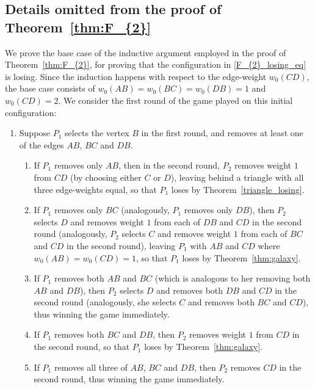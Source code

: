 \documentclass[11pt,reqno]{amsart}
\theoremstyle{definition}
\theoremstyle{definition}
\begin{document}
\subsection{Details omitted from the proof of Theorem~\ref{thm:F_{2}}}\label{subsec:appendix_4_vertices}
We prove the base case of the inductive argument employed in the proof of Theorem~\ref{thm:F_{2}}, for proving that the configuration in \eqref{F_{2}_losing_eq} is losing. Since the induction happens with respect to the edge-weight $w_{0}(CD)$, the base case consists of $w_{0}(AB)=w_{0}(BC)=w_{0}(DB)=1$ and $w_{0}(CD)=2$. We consider the first round of the game played on this initial configuration:
\begin{enumerate}
\item Suppose $P_{1}$ selects the vertex $B$ in the first round, and removes at least one of the edges $AB$, $BC$ and $DB$. 
\begin{enumerate}
\item  If $P_{1}$ removes only $AB$, then in the second round, $P_{2}$ removes weight $1$ from $CD$ (by choosing either $C$ or $D$), leaving behind a triangle with all three edge-weights equal, so that $P_{1}$ loses by Theorem~\ref{triangle_losing}.
\item If $P_{1}$ removes only $BC$ (analogously, $P_{1}$ removes only $DB$), then $P_{2}$ selects $D$ and removes weight $1$ from each of $DB$ and $CD$ in the second round (analogously, $P_{2}$ selects $C$ and removes weight $1$ from each of $BC$ and $CD$ in the second round), leaving $P_{1}$ with $AB$ and $CD$ where $w_{0}(AB)=w_{0}(CD)=1$, so that $P_{1}$ loses by Theorem~\ref{thm:galaxy}.
\item If $P_{1}$ removes both $AB$ and $BC$ (which is analogous to her removing both $AB$ and $DB$), then $P_{2}$ selects $D$ and removes both $DB$ and $CD$ in the second round (analogously, she selects $C$ and removes both $BC$ and $CD$), thus winning the game immediately.
\item If $P_{1}$ removes both $BC$ and $DB$, then $P_{2}$ removes weight $1$ from $CD$ in the second round, so that $P_{1}$ loses by Theorem~\ref{thm:galaxy}.
\item If $P_{1}$ removes all three of $AB$, $BC$ and $DB$, then $P_{2}$ removes $CD$ in the second round, thus winning the game immediately.
\end{enumerate}


\end{enumerate}
\end{document}
